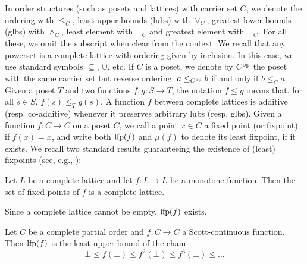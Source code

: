 In order structures (such as posets and lattices) with carrier set $C$, we denote the ordering with $\le_C$, least upper bounds (lubs) with $\vee_C$, greatest lower bounds (glbs) with $\wedge_C$, least element with $\bot_C$ and greatest element with $\top_C$. For all these, we omit the subscript when clear from the context.
We recall that any powerset is a complete lattice with ordering given by inclusion. In this case, we use standard symbols $\subseteq$, $\cup$, etc.
If $C$ is a poset, we denote by $C^{\text{op}}$ the poset with the same carrier set but reverse ordering: $a \le_{C^{\text{op}}} b$ if and only if $b \le_C a$.
Given a poset $T$ and two functions $f, g: S \rightarrow T$, the notation $f \le g$ means that, for all $s \in S$, $f(s) \le_T g(s)$.
A function $f$ between complete lattices is additive (resp. co-additive) whenever it preserves arbitrary lubs (resp. glbs).
Given a function $f : C \rightarrow C$ on a poset $C$, we call a point $x \in C$ a fixed point (or fixpoint) if $f(x) = x$, and write both $\text{lfp}(f)$ and $\mu(f)$ to denote its least fixpoint, if it exists. We recall two standard results guaranteeing the existence of (least) fixpoints (see, e.g., \cite{DP02}):
\begin{theorem}\label{th:bg:knaster-tarski}
	Let $L$ be a complete lattice and let $f: L \rightarrow L$ be a monotone function. Then the set of fixed points of $f$ is a complete lattice.
\end{theorem}
\begin{corollary}
	Since a complete lattice cannot be empty, $\text{lfp}(f)$ exists.
\end{corollary}
\begin{theorem}[Kleene]\label{th:bg:kleene}
	Let $C$ be a complete partial order and $f : C \rightarrow C$ a Scott-continuous function. Then $\text{lfp}(f)$ is the least upper bound of the chain
	\[
	\bot \le f(\bot) \le f^2(\bot) \le f^3(\bot) \le \dots
	\]
\end{theorem}

